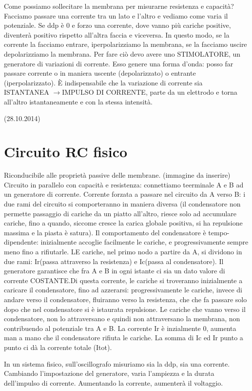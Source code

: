 \documentclass[a4paper,12pt]{article}
\newcommand{\freccia}{\ensuremath{\rightarrow}}
\begin{document}
Come possiamo sollecitare la membrana per misurarne resistenza e capacità?
Facciamo passare una corrente tra un lato e l'altro e vediamo come varia il potenziale. Se ddp è 0 e forzo una corrente, dove vanno più cariche positive, diventerà positivo rispetto all'altra faccia e viceversa. In questo modo, se la corrente la facciamo entrare, iperpolarizziamo la membrana, se la facciamo uscire depolarizziamo la membrana.
Per fare ciò devo avere uno STIMOLATORE, un generatore di variazioni di corrente. Esso genere una forma d'onda: posso far passare corrente o in maniera uscente (depolarizzato) o entrante (iperpolarizzato). È indispensabile che la variazione di corrente sia ISTANTANEA \freccia IMPULSO DI CORRENTE, parte da un elettrodo e torna all'altro istantaneamente e con la stessa intensità.

(28.10.2014)
\section{Circuito RC fisico}
Riconducibile alle proprietà passive delle membrane.
(immagine da inserire)
Circuito in parallelo con capacità e resistenza: connettiamo teerminale A e B ad un generatore di corrente. Corrente forzata a passare nel circuito da A verso B: i due rami del circuito si comporteranno in maniera diversa (il condensatore non permette passaggio di cariche da un piatto all'altro, riesce solo ad accumulare cariche, fino a quando, siccome cresce la carica globale positiva, si ha repulsione massima e la piasta è satura). Il comportamento del condensatore è tempo-dipendente: inizialmente accoglie facilmente le cariche, e progressivamente sempre meno fino a rifiutarle.
LE cariche, nel primo nodo a partire da A, si dividono in due rami: Ir(passa attraverso la resistenza) e Ic(passa al condensatore). Il generatore garantisce che fra A e B in ogni istante ci sia un dato valore di corrente COSTANTE.Di questa corrente, le cariche si troveranno inizialmente a caricare il condensatore, fino ad azzerarsi: progressivamente le cariche, invece di andare verso il condensatore, fluiranno verso la resistenza, che che fa passare solo dopo che nel condensatore si è istaurata repulsione.
Le cariche che vanno verso il condensatore, non lo attraversano e quindi non attraversano la membrana, non contribuendo al potenziale tra A e B. 
La corrente Ir è inzialmente 0, aumenta man a mano che il condensatore rifiuta le cariche. La somma di Ic ed Ir punto a punto ci dà la corrente totale (Itot).

In un sistema fisico, sull'oscillografo misuriamo sia la ddp, sia una corrente. Cambiando l'impostazione del generatore, varia l'ampiezza e la durata dell'impulso di corrente. 
Aumentando la corrente, aumenterà il voltaggio.
\end{document}
